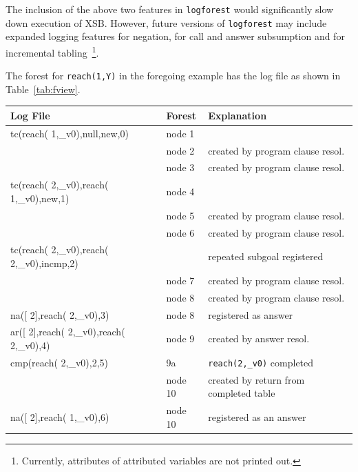 \noindent
The inclusion of the above two features in {\tt logforest} would
significantly slow down execution of XSB.  However, future versions of
{\tt logforest} may include expanded logging features for negation,
for call and answer subsumption and for incremental
tabling~\footnote{Currently, attributes of attributed variables are
  not printed out.}.

\begin{example}
The forest for {\tt reach(1,Y)} in the foregoing example has the log
file as shown in Table~\ref{tab:fview}.

\begin{table}[htbp]
\begin{tabular}{lll}               \\ \hline  
Log File                                     & Forest & Explanation\\ \hline 
tc(reach( 1,\_v0),null,new,0)                & node 1 & \\
                                             & node 2 & created by program clause resol. \\
                                             & node 3 & created by program clause resol. \\
tc(reach( 2,\_v0),reach( 1,\_v0),new,1)      & node 4 & \\
                                             & node 5 & created by program clause resol.\\
                                             & node 6 & created by program clause resol. \\
tc(reach( 2,\_v0),reach( 2,\_v0),incmp,2)    &        & repeated subgoal registered\\
                                             & node 7 & created by program clause resol. \\
                                             & node 8 & created by program clause resol. \\
na([ 2],reach( 2,\_v0),3)                    & node 8 & registered as answer\\
ar([ 2],reach( 2,\_v0),reach( 2,\_v0),4)     & node 9 & created by answer resol.\\
cmp(reach( 2,\_v0),2,5)                      &    9a   & {\tt reach(2,\_v0)} completed \\
                                             & node 10 & created by return from completed table \\
na([ 2],reach( 1,\_v0),6)                    & node 10 & registered as an answer\\

\end{tabular}
\end{table}
\end{example}
